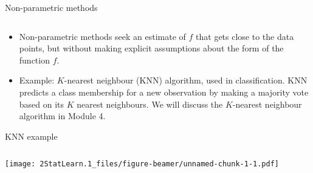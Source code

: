 \documentclass[ignorenonframetext,]{beamer}
\providecommand{\tightlist}{%
  \setlength{\itemsep}{0pt}\setlength{\parskip}{0pt}}
\begin{document}
\begin{frame}

\begin{block}{Non-parametric methods}

\(~\)

\begin{itemize}
\tightlist
\item
  Non-parametric methods seek an estimate of \(f\) that gets close to
  the data points, but without making explicit assumptions about the
  form of the function \(f\).
\end{itemize}

\vspace{2mm}

\begin{itemize}
\tightlist
\item
  Example: \(K\)-nearest neighbour (KNN) algorithm, used in
  classification. KNN predicts a class membership for a new observation
  by making a majority vote based on its \(K\) nearest neighbours. We
  will discuss the \(K\)-nearest neighbour algorithm in Module 4.
\end{itemize}

\end{block}

\end{frame}

\begin{frame}

\begin{block}{KNN example}

\(~\)

\texttt{[image: 2StatLearn.1\_files/figure-beamer/unnamed-chunk-1-1.pdf]}

\end{block}

\end{frame}
\end{document}
